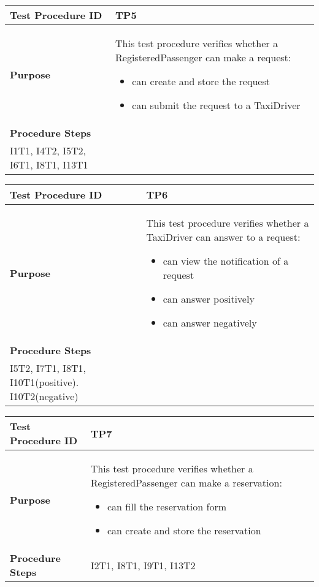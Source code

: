 			\vspace{1cm}
			\begin{tabular}{p{4cm} | p{8cm}} \hline
				\textbf{Test Procedure ID} & TP5 \\ \hline
				\textbf{Purpose} & This test procedure verifies whether a RegisteredPassenger can make a request:
				\begin{itemize}
					\item can create and store the request
					\item can submit the request to a TaxiDriver
				\end{itemize}
				\\ \hline
				\textbf{Procedure Steps} &  \\ I1T1, I4T2, I5T2, I6T1, I8T1, I13T1 \\ \hline
			\end{tabular}
			\vspace{1cm}
			\begin{tabular}{p{4cm} | p{8cm}} \hline
				\textbf{Test Procedure ID} & TP6 \\ \hline
				\textbf{Purpose} & This test procedure verifies whether a TaxiDriver can answer to a request:
				\begin{itemize}
					\item can view the notification of a request
					\item can answer positively
					\item can answer negatively
				\end{itemize}
				\\ \hline
				\textbf{Procedure Steps} &  \\ I5T2, I7T1, I8T1, I10T1(positive). I10T2(negative) \\ \hline
			\end{tabular}
			\vspace{1cm}
			\begin{tabular}{p{4cm} | p{8cm}} \hline
				\textbf{Test Procedure ID} & TP7 \\ \hline
				\textbf{Purpose} & This test procedure verifies whether a RegisteredPassenger can make a reservation:
				\begin{itemize}
					\item can fill the reservation form
					\item can create and store the reservation
				\end{itemize}
				\\ \hline
				\textbf{Procedure Steps} & I2T1, I8T1, I9T1, I13T2 \\ \hline
			\end{tabular}
